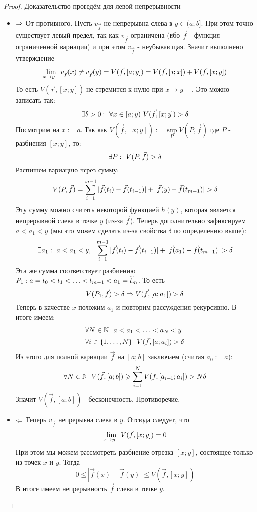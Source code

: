 \begin{proof}
	Доказательство проведём для левой непрерывности
	\begin{itemize}
		\item $\Rightarrow$ От противного. Пусть $v_{\vec{f}}$ не непрерывна слева в $y \in (a; b]$. При этом точно существует левый предел, так как $v_{\vec{f}}$ ограничена (ибо $\vec{f}$ - функция ограниченной вариации) и при этом $v_{\vec{f}}$ - неубывающая. Значит выполнено утверждение
		\[
			\lim\limits_{x \to y-} v_{\vec{f}}(x) \neq v_{\vec{f}}(y) = V(\vec{f}, [a; y]) = V(\vec{f}, [a; x]) + V(\vec{f}, [x; y])
		\]
		То есть $V(\vec{r}, [x; y])$ не стремится к нулю при $x \to y-$. Это можно записать так:
		\[
			\exists \delta > 0 :\  \forall x \in [a; y)\ V(\vec{f}, [x; y]) > \delta
		\]
		Посмотрим на $x := a$. Так как $V(\vec{f}, [x; y]) := \sup\limits_{P} V(P, \vec{f})$ где $P$ - разбиения $[x; y]$, то:
		\[
			\exists P :\  V(P, \vec{f}) > \delta
		\]
		Распишем вариацию через сумму:
		\[
			V(P, \vec{f}) = \sum\limits_{i = 1}^{m - 1} |\vec{f}(t_i) - \vec{f}(t_{i - 1})| + |\vec{f}(y) - \vec{f}(t_{m - 1})| > \delta
		\]
		Эту сумму можно считать некоторой функцией $h(y)$, которая является непрерывной слева в точке $y$ (из-за $\vec{f}$). Теперь дополнительно зафиксируем $a < a_1 < y$ (мы это можем сделать из-за свойства $\delta$ по определению выше):
		\[
			\exists a_1 :\  a < a_1 < y,\ \ \sum\limits_{i = 1}^{m - 1} |\vec{f}(t_i) - \vec{f}(t_{i - 1})| + |\vec{f}(a_1) - \vec{f}(t_{m - 1})| > \delta
		\]
		Эта же сумма соответствует разбиению $P_1: a = t_0 < t_1 < \ldots < t_{m - 1} < a_1 = \widetilde{t}_m$. То есть
		\[
			V(P_1, \vec{f}) > \delta \Rightarrow V(\vec{f}, [a; a_1]) > \delta
		\]
		Теперь в качестве $x$ положим $a_1$ и повторим рассуждения рекурсивно. В итоге имеем:
		\begin{align*}
			&{\forall N \in \mathbb{N}\ \ a < a_1 < \ldots < a_N < y}
			\\
			&{\forall i \in \{1, \ldots, N\}\ \ V(\vec{f}, [a; a_i]) > \delta}
		\end{align*}
		Из этого для полной вариации $\vec{f}$ на $[a; b]$ заключаем (считая $a_0 := a$):
		\[
			\forall N \in \mathbb{N}\ \ V(\vec{f}, [a; b]) \geqslant \sum\limits_{i = 1}^N V(f, [a_{i - 1}; a_i]) > N\delta
		\]
		Значит $V(\vec{f}, [a; b])$ - бесконечность. Противоречие.
		
		\item $\Leftarrow$ Теперь $v_{\vec{f}}$ непрерывна слева в $y$. Отсюда следует, что
		\[
			\lim\limits_{x \to y-} V(\vec{f}, [x; y]) = 0
		\]
		При этом мы можем рассмотреть разбиение отрезка $[x; y]$, состоящее только из точек $x$ и $y$. Тогда
		\[
			0 \le |\vec{f}(x) - \vec{f}(y)| \le V(\vec{f}, [x; y])
		\]
		В итоге имеем непрерывность $\vec{f}$ слева в точке $y$.
	\end{itemize}
\end{proof}

